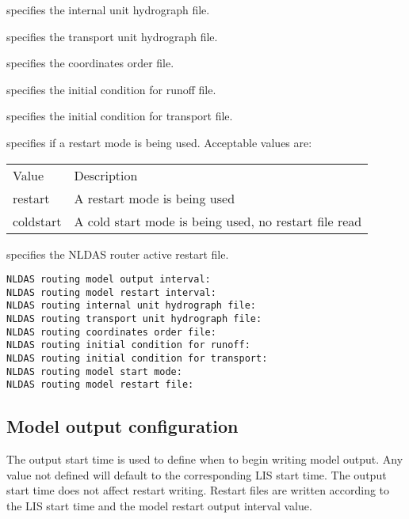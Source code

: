   specifies the
 internal unit hydrograph file.

  specifies
 the transport unit hydrograph file.

  specifies the
 coordinates order file.

  specifies the
 initial condition for runoff file.

  specifies
 the initial condition for transport file.

  specifies if a restart mode is
 being used. 
 Acceptable values are:

 \begin{tabular}{ll}
 Value     & Description                                           \\
 restart   & A restart mode is being used                          \\
 coldstart & A cold start mode is being used, no restart file read \\
 \end{tabular}

  specifies the NLDAS router
 active restart file.
 

 \begin{Verbatim}[frame=single]
NLDAS routing model output interval:
NLDAS routing model restart interval:
NLDAS routing internal unit hydrograph file:
NLDAS routing transport unit hydrograph file:
NLDAS routing coordinates order file:
NLDAS routing initial condition for runoff:
NLDAS routing initial condition for transport:
NLDAS routing model start mode:
NLDAS routing model restart file:
 \end{Verbatim}

 
 \subsection{Model output configuration} \label{ssec:outputconfig}
 

 
 The output start time is used to define when to begin writing
 model output.  Any value not defined will default to the corresponding
 LIS start time.  The output start time does not affect restart writing.
 Restart files are written according to the LIS start time and the model
 restart output interval value.

